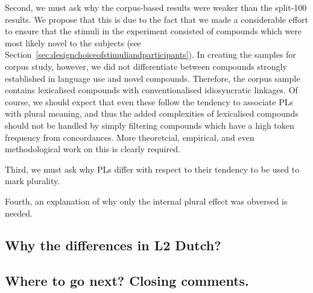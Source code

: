 Second, we must ask why the corpus-based results were weaker than the split-100 results.
We propose that this is due to the fact that we made a considerable effort to ensure that the stimuli in the experiment consisted of compounds which were most likely novel to the subjects (see Section~\ref{sec:designchoiceofstimuliandparticipants}).
In creating the samples for corpus study, however, we did not differentiate between compounds strongly established in language use and novel compounds.
Therefore, the corpus sample contains lexicalised compounds with conventionalised idiosyncratic linkages.
Of course, we should expect that even these follow the tendency to associate PLs with plural meaning, and thus the added complexities of lexicalised compounds should not be handled by simply filtering compounds which have a high token frequency from concordances.
More theoretcial, empirical, and even methodological work on this is clearly required.


Third, we must ask why PLs differ with respect to their tendency to be used to mark plurality.




Fourth, an explanation of why only the internal plural effect was obversed is needed.


\subsection{Why the differences in L2 Dutch?}



\subsection{Where to go next? Closing comments.}


